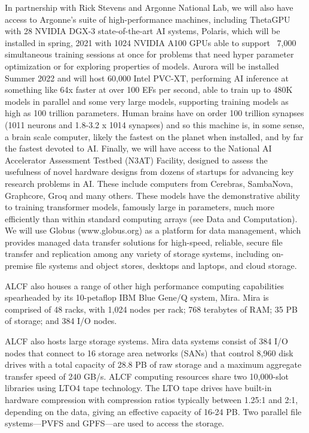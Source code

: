 \documentclass[onecolumn, compsoc,12pt]{IEEEtran}
\begin{document}
In partnership with Rick Stevens and Argonne National Lab, we will also have access to Argonne’s suite of high-performance machines, including ThetaGPU with 28 NVIDIA DGX-3 state-of-the-art AI systems, Polaris, which will be installed in spring, 2021 with 1024 NVIDIA A100 GPUs able to support ~7,000 simultaneous training sessions at once for problems that need hyper parameter optimization or for exploring properties of models. Aurora will be installed Summer 2022 and will host 60,000 Intel PVC-XT, performing AI inference at something like 64x faster at over 100 EFs per second, able to train up to 480K models in parallel and some very large models, supporting training models as high as 100 trillion parameters. Human brains have on order 100 trillion synapses (1011 neurons and 1.8-3.2 x 1014 synapses) and so this machine is, in some sense, a brain scale computer, likely the fastest on the planet when installed, and by far the fastest devoted to AI. Finally, we will have access to the National AI Accelerator Assessment Testbed (N3AT) Facility, designed to assess the usefulness of novel hardware designs from dozens of startups for advancing key research problems in AI. These include computers from Cerebras, SambaNova, Graphcore, Groq and many others. These models have the demonstrative ability to training transformer models, famously large in parameters, much more efficiently than within standard computing arrays (see Data and Computation). We will use Globus (www.globus.org) as a platform for data management, which provides managed data transfer solutions for high-speed, reliable, secure file transfer and replication among any variety of storage systems, including on-premise file systems and object stores, desktops and laptops, and cloud storage.


ALCF also houses a range of other 
high performance computing capabilities spearheaded by its 
10-petaflop IBM Blue Gene/Q system, Mira. 
Mira is comprised of 48 racks, with 1,024 nodes per rack; 768 terabytes of RAM; 35 PB of storage; and 384 I/O nodes. 

ALCF also hosts large storage systems. Mira data systems consist of 384 I/O nodes
that connect to 16 storage area networks (SANs) that control 8,960 disk drives with 
a total capacity of 28.8 PB of raw storage and a maximum aggregate transfer 
speed of 240 GB/s. 
ALCF computing resources share two 10,000-slot libraries using LTO4 tape technology. 
The LTO tape drives have built-in hardware compression with compression ratios typically 
between 1.25:1 and 2:1, depending on the data, giving an effective capacity of 16-24 PB.
Two parallel file systems---PVFS and GPFS---are used to access the storage. 
\end{document}
